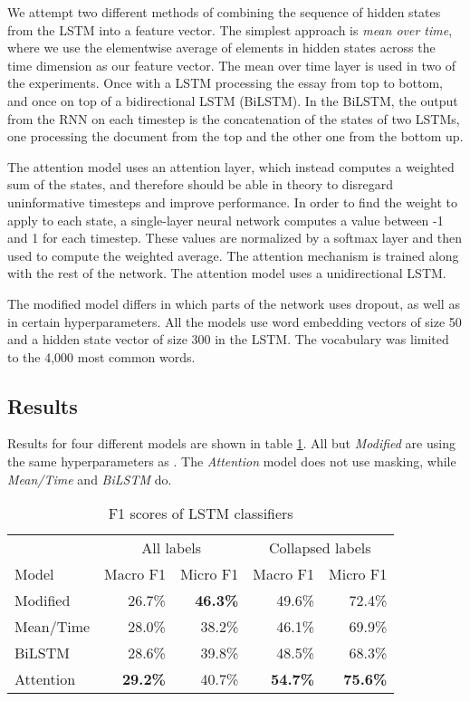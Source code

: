 We attempt two different methods of combining the sequence of hidden states
from the \ac{LSTM} into a feature vector. The simplest approach is \emph{mean
over time}, where we use the elementwise average of elements in hidden states
across the time dimension as our feature vector. The mean over time layer is
used in two of the experiments. Once with a \ac{LSTM} processing the essay
from top to bottom, and once on top of a bidirectional LSTM (BiLSTM). In the
BiLSTM, the output from the \ac{RNN} on each timestep is the concatenation of
the states of two \acp{LSTM}, one processing the document from the top and
the other one from the bottom up.

The attention model uses an attention layer, which instead computes a
weighted sum of the states, and therefore should be able in theory to
disregard uninformative timesteps and improve performance. In order to find
the weight to apply to each state, a single-layer neural network computes a
value between -1 and 1 for each timestep. These values are normalized by a
softmax layer and then used to compute the weighted average. The attention
mechanism is trained along with the rest of the network. The attention model
uses a unidirectional \ac{LSTM}.

The modified model differs in which parts of the network uses dropout, as
well as in certain hyperparameters. All the models use word embedding vectors
of size 50 and a hidden state vector of size 300 in the \ac{LSTM}. The
vocabulary was limited to the 4,000 most common words.

\subsection{Results}

Results for four different models are shown in table \ref{lstm-results}. All
but \emph{Modified} are using the same hyperparameters as
\citeauthor{taghipour16}. The \emph{Attention} model does not use masking,
while \emph{Mean/Time} and \emph{BiLSTM} do.

\begin{table}
  \centering
  \begin{tabular}{|l|rr|rr|}
    \toprule
            & \multicolumn{2}{c|}{All labels} & \multicolumn{2}{c|}{Collapsed labels} \\
    Model     & Macro F1        & Micro F1        & Macro F1        & Micro F1        \\
    \midrule
    Modified  &         26.7\%  & \textbf{46.3\%} &         49.6\%  &         72.4\%  \\
    Mean/Time &         28.0\%  &         38.2\%  &         46.1\%  &         69.9\%  \\
    BiLSTM    &         28.6\%  &         39.8\%  &         48.5\%  &         68.3\%  \\
    Attention & \textbf{29.2\%} &         40.7\%  & \textbf{54.7\%} & \textbf{75.6\%} \\
    \bottomrule
  \end{tabular}
  \caption{F1 scores of LSTM classifiers}
  \label{lstm-results}
\end{table}


